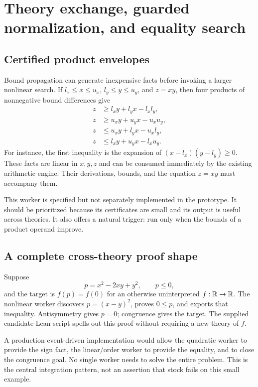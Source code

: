 \section{Theory exchange, guarded normalization, and equality search}

\subsection{Certified product envelopes}

Bound propagation can generate inexpensive facts before invoking a larger nonlinear search. If $l_x\le x\le u_x$, $l_y\le y\le u_y$, and $z=xy$, then four products of nonnegative bound differences give
\begin{align*}
 z&\ge l_xy+l_yx-l_xl_y,\\
 z&\ge u_xy+u_yx-u_xu_y,\\
 z&\le u_xy+l_yx-u_xl_y,\\
 z&\le l_xy+u_yx-l_xu_y.
\end{align*}
For instance, the first inequality is the expansion of $(x-l_x)(y-l_y)\ge0$. These facts are linear in $x,y,z$ and can be consumed immediately by the existing arithmetic engine. Their derivations, bounds, and the equation $z=xy$ must accompany them.

This worker is specified but not separately implemented in the prototype. It should be prioritized because its certificates are small and its output is useful across theories. It also offers a natural trigger: run only when the bounds of a product operand improve.

\subsection{A complete cross-theory proof shape}

Suppose
\[
 p=x^2-2xy+y^2,\qquad p\le0,
\]
and the target is $f(p)=f(0)$ for an otherwise uninterpreted $f:\mathbb{R}\to\mathbb{R}$. The nonlinear worker discovers $p=(x-y)^2$, proves $0\le p$, and exports that inequality. Antisymmetry gives $p=0$; congruence gives the target. The supplied candidate Lean script spells out this proof without requiring a new theory of $f$.

A production event-driven implementation would allow the quadratic worker to provide the sign fact, the linear/order worker to provide the equality, and \grind{} to close the congruence goal. No single worker needs to solve the entire problem. This is the central integration pattern, not an assertion that stock \grind{} fails on this small example.

